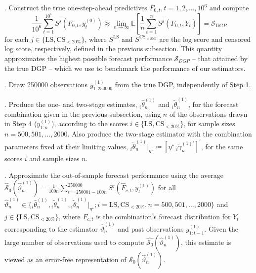 \documentclass[12pt]{article}
\theoremstyle{definition}
\theoremstyle{remark}
\begin{document}
\medskip

. Construct the true one-step-ahead predictives $F_{0,t}, t = 1, 2, \ldots, 10^6$ and compute 
\begin{equation}
\frac{1}{10^6} \sum_{t = 1}^{10^6} S^j(F_{0,t}, y^{(0)}_t) \approx \lim_{n \to \infty} \mathbb{E} \left[ \frac{1}{n} \sum_{t=1}^n S^j(F_{0,t}, Y_t) \right] = \mathcal{S}_{DGP}  \label{eqn:sdgp}
\end{equation}
for each $j \in \{\mathrm{LS}, \mathrm{CS}_{<20\%}\}$, where $S^{\mathrm{LS}} $ and $S^{\mathrm{CS}_{<20\%}}$ are the log score and censored log score, respectively, defined in the previous subsection. This quantity approximates the highest possible forecast performance $\mathcal{S}_{DGP}$ -- that attained by the true DGP -- which we use to benchmark the performance of our estimators.

\medskip

. Draw 250000 observations $y^{(1)}_{1:250000}$ from the true DGP, independently of Step 1.

\medskip

. Produce the one- and two-stage estimates, ${}_{i}\hat{\theta}_{n}^{(1)}$ and ${}_{i}\tilde{\theta}_{n}^{(1)}$, for the forecast combination given in the previous subsection, using $n$ of the observations drawn in Step 4 ($y_{1:n}^{(1)}$), according to the scores $i\in \{\mathrm{LS},\mathrm{CS}_{<20\%}\}$, for sample sizes $n=500,501,\ldots ,2000$. Also produce the two-stage estimator with the combination parameters fixed at their limiting values, ${}_{i}\tilde{\theta}_{n}^{(1)}|_{\eta ^{\star }} \coloneqq [ \eta ^{\star}\ {}_{i}\tilde{\gamma}_{n}^{(1)\prime} ]^{\prime}$, for the same scores $i$ and sample sizes $n$.

\medskip

. Approximate the out-of-sample forecast performance using the average $\hat{\mathcal{S}}_{0}(\hat{\vartheta}^{(1)}_n) = \frac{1}{100n} \sum_{t = 250001 - 100n}^{250000} S^j(\hat{F}_{c,t}, y^{(1)}_{t})$ for all $\hat{\vartheta}^{(1)}_n \in \{{}_i\hat{\theta}^{(1)}_n, {}_i\tilde{\theta}^{(1)}_n, {}_i\tilde{\theta}^{(1)}_n|_{\eta^{\star}}; i = \mathrm{LS}, \mathrm{CS}_{<20\%}, n = 500,\allowbreak 501,\allowbreak \ldots,\allowbreak 2000\}$ and $j \in \{ \mathrm{LS}, \mathrm{CS}_{<20\%} \}$, where $\hat{F}_{c,t}$ is the combination's forecast distribution for $Y_t$ corresponding to the estimator $\hat{\vartheta}^{(1)}_n$ and past observations $y^{(1)}_{1:t-1}$. Given the large number of observations used to compute $\hat{\mathcal{S}_0}(\hat{\vartheta}_n^{(1)})$, this estimate is viewed as an error-free representation of $\mathcal{S}_0(\hat{\vartheta}_n^{(1)})$.
\end{document}
